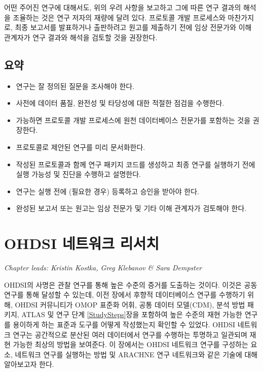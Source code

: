 \documentclass[10.5pt]{book}
\providecommand{\tightlist}{%
  \setlength{\itemsep}{0pt}\setlength{\parskip}{0pt}}
\theoremstyle{definition}
\theoremstyle{definition}
\theoremstyle{definition}
\theoremstyle{remark}
\let\BeginKnitrBlock\begin \let\EndKnitrBlock\end
\begin{document}
어떤 주어진 연구에 대해서도, 위의 우려 사항을 보고하고 그에 따른 연구
결과의 해석을 조율하는 것은 연구 저자의 재량에 달려 있다. 프로토콜 개발
프로세스와 마찬가지로, 최종 보고서를 발표하거나 출판하려고 원고를
제출하기 전에 임상 전문가와 이해 관계자가 연구 결과와 해석을 검토할 것을
권장한다.

\section{요약}\label{-17}

\BeginKnitrBlock{rmdsummary}
\begin{itemize}
\tightlist
\item
  연구는 잘 정의된 질문을 조사해야 한다.
\item
  사전에 데이터 품질, 완전성 및 타당성에 대한 적절한 점검을 수행한다.
\item
  가능하면 프로토콜 개발 프로세스에 원천 데이터베이스 전문가를 포함하는
  것을 권장한다.
\item
  프로토콜로 제안된 연구를 미리 문서화한다.
\item
  작성된 프로토콜과 함께 연구 패키지 코드를 생성하고 최종 연구를
  실행하기 전에 실행 가능성 및 진단을 수행하고 설명한다.
\item
  연구는 실행 전에 (필요한 경우) 등록하고 승인을 받아야 한다.
\item
  완성된 보고서 또는 원고는 임상 전문가 및 기타 이해 관계자가 검토해야
  한다.
\end{itemize}
\EndKnitrBlock{rmdsummary}

\chapter{OHDSI 네트워크 리서치}\label{NetworkResearch}

\emph{Chapter leads: Kristin Kostka, Greg Klebanov \& Sara Dempster}

OHDSI의 사명은 관찰 연구를 통해 높은 수준의 증거를 도출하는 것이다.
이것은 공동 연구를 통해 달성할 수 있는데, 이전 장에서 후향적
데이터베이스 연구를 수행하기 위해, OHDSI 커뮤니티가 OMOP 표준화 어휘,
공통 데이터 모델(CDM), 분석 방법 패키지, ATLAS 및 연구 단계
\ref{StudySteps}장을 포함하여 높은 수준의 재현 가능한 연구를 용이하게
하는 표준과 도구를 어떻게 작성했는지 확인할 수 있었다. OHDSI 네트워크
연구는 공간적으로 분산된 여러 데이터에서 연구를 수행하는 투명하고
일관되며 재현 가능한 최상의 방법을 보여준다. 이 장에서는 OHDSI 네트워크
연구를 구성하는 요소, 네트워크 연구를 실행하는 방법 및 ARACHNE 연구
네트워크와 같은 기술에 대해 알아보고자 한다.
\end{document}
